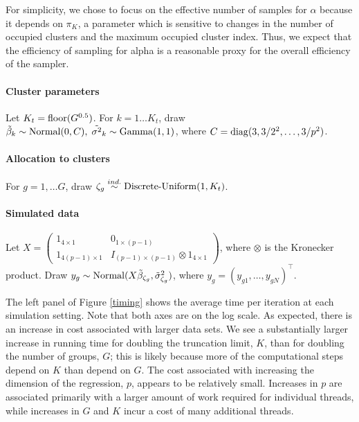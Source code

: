{For simplicity, we chose to focus on the effective number of samples for $\alpha$ because it depends on $\pi_K$, a parameter which is sensitive to changes in the number of occupied clusters and the maximum occupied cluster index. Thus, we expect that the efficiency of sampling for alpha is a reasonable proxy for the overall efficiency of the sampler.

\paragraph{Cluster parameters}
Let $K_{t} = \operatorname{floor}(G^{0.5})$. For $k=1 \ldots K_{t}$, draw $\tilde{\beta}_k \sim \operatorname{Normal}(0, C),\; \tilde{\sigma^2}_k \sim \operatorname{Gamma}(1, 1)$, where $C=\operatorname{diag}(3, 3/2^2, \ldots, 3/p^2)$.
  
\paragraph{Allocation to clusters} For $g=1,\ldots G$, draw $\zeta_g \stackrel{ind.}{\sim} \operatorname{Discrete-Uniform}(1,K_t)$. 
  
\paragraph{Simulated data}
 Let $X = \begin{pmatrix} 1_{4 \times 1} & 0_{1\times(p-1)}\\
                                 1_{4(p-1) \times 1} & I_{(p-1)\times(p-1)} \otimes 1_{4\times 1} \end{pmatrix}$, where $\otimes$ is the Kronecker product. Draw $y_{g} \sim \operatorname{Normal}(X\tilde{\beta}_{\zeta_g}, \tilde{\sigma}^2_{\zeta_g})$, where $y_{g}=\left(y_{g1},\ldots,y_{gN}\right)^\top$.

The left panel of Figure \ref{timing} shows the average time per iteration at each simulation setting. Note that both axes are on the log scale. As expected, there is an increase in cost associated with larger data sets. We see a substantially larger increase in running time for doubling the truncation limit, $K$, than for doubling the number of groups, $G$; this is likely because more of the computational steps depend on $K$ than depend on $G$. The cost associated with increasing the dimension of the regression, $p$, appears to be relatively small. Increases in $p$ are associated primarily with a larger amount of work required for individual threads, while increases in $G$ and $K$ incur a cost of many additional threads.

}
